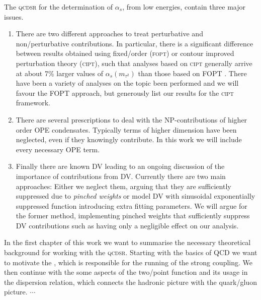 \documentclass[../../index.tex]{subfiles}
\begin{document}
The \textsc{qcdsr} for the determination of $\alpha_s$, from low energies,
contain three major issues.
\begin{enumerate}
\item There are two different approaches to treat perturbative and
  non\-/perturbative contributions. In particular, there is a significant
  difference between results obtained using fixed\-/order (\textsc{fopt}) or
  contour improved perturbation theory (\textsc{cipt}), such that analyses based
  on \textsc{cipt} generally arrive at about 7\% larger values of
  $\alpha_s(m_{\tau^2})$ than those based on FOPT \cite{PDG2018}. There have
  been a variety of analyses on the topic been performed
  \cite{Pich2013,Caprini2009,Jamin2005} and we will favour the FOPT approach,
  but generously list our results for the \textsc{cipt} framework.

\item There are several prescriptions to deal with the NP-contributions of
  higher order OPE condensates. Typically terms of higher dimension have been
  neglected, even if they knowingly contribute. In this work we will include
  every necessary OPE term.

\item Finally there are known DV leading to an ongoing discussion of the
  importance of contributions from DV. Currently there are two main approaches:
  Either we neglect them, arguing that they are sufficiently suppressed due to
  \textit{pinched weights} \cite{Pich2016} or model DV with sinusoidal
  exponentially suppressed function \cite{Cata2008,Boito2011a,Boito2014}
  introducing extra fitting parameters. We will argue for the former method,
  implementing pinched weights that sufficiently suppress DV contributions such
  as having only a negligible effect on our analysis.
\end{enumerate}

In the first chapter of this work we want to summarise the necessary theoretical
background for working with the \textsc{qcdsr}. Starting with the basics of QCD
we want to motivate the , which is
responsible for the running of the strong coupling. We then continue with the
some aspects of the two\-/point function and its usage in the dispersion
relation, which connects the hadronic picture with the quark\-/gluon picture.
$\cdots$
\end{document}
